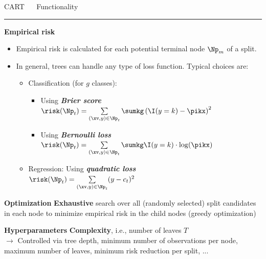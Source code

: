 \documentclass[11pt,compress,t,notes=noshow, xcolor=table]{beamer}
\begin{document}

\LARGE
\begin{frame}{\textcolor{gray!80}{CART} ~~ Functionality}
\normalsize
\vspace{-0.5cm}
\noindent \textcolor{gray!80}{\rule{\textwidth}{1pt}}

\footnotesize

\textbf{\textcolor{gray!80}{Empirical risk}} \\

\begin{itemize}
  \item Empirical risk is calculated for each potential terminal node $\Np_m$
  of a split.
  \item In general, trees can handle any type of loss function. Typical choices
  are:
  \begin{itemize}
    \footnotesize
    \item Classification (for $g$ classes):
    \begin{itemize}
      \footnotesize
      \item Using \textit{\textbf{Brier score}} \\
      $\risk(\Np_t) = \sum\limits_{(\xv,y) \in \Np_t} \sumkg \left( \I(y = k)
      - \pikx \right)^2$
      \item Using \textit{\textbf{Bernoulli loss}} \\
      $\risk(\Np_t) = \sum\limits_{(\xv,y) \in \Np_t} \sumkg \I(y = k) \cdot
      \log(\pikx)$
    \end{itemize}
    \item Regression: Using \textit{\textbf{quadratic loss}} \\
    $\risk(\Np_t) = \sum\limits_{(\xv,y) \in \Np_t} (y - c_t)^2$
  \end{itemize}
\end{itemize}

\smallskip

\textbf{\textcolor{gray!80}{Optimization}} {}{} \textbf{Exhaustive} search over
all (randomly selected) split candidates in each node to minimize empirical risk 
in the child nodes (greedy optimization) \\

\smallskip

\textbf{\textcolor{gray!80}{Hyperparameters}} {}{} \textbf{Complexity}, i.e., 
number of leaves $T$ \\
$\rightarrow$ Controlled via tree depth, minimum number of observations per 
node, maximum number of leaves, minimum risk reduction per split, ...

\normalsize
  
\end{frame}
\end{document}
